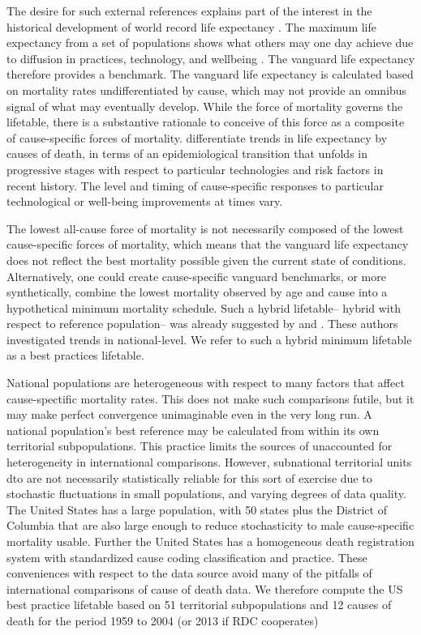 \documentclass[11pt,oneside,a4paper]{article} %
\begin{document}
The desire for such external references explains part of the interest in the
historical development of world record life expectancy \citep{oeppen2002broken}.
The maximum life expectancy from a set of populations shows what others may one
day achieve due to diffusion in practices, technology, and wellbeing
\citep{vallin2010esperance}.
The vanguard life expectancy therefore provides a benchmark. The vanguard life expectancy is calculated based on mortality rates undifferentiated
by cause, which may not provide an omnibus signal of what may eventually develop. While the force of mortality governs the lifetable, there is a substantive rationale to conceive of this force as a composite of cause-specific forces of mortality. \citet{vallin2008minimum} differentiate trends in life expectancy by causes of death, in terms of an epidemiological transition that unfolds in progressive stages with respect to particular technologies and risk factors in recent history. The level and timing of cause-specific responses to particular technological or well-being improvements at times vary.

The lowest all-cause force of mortality is not necessarily composed of the
lowest cause-specific forces of mortality, which means that the vanguard life
expectancy does not reflect the best mortality possible given the current state
of conditions. Alternatively, one could create cause-specific vanguard
benchmarks, or more synthetically, combine the lowest mortality observed by age
and cause into a hypothetical minimum mortality schedule. Such a hybrid
lifetable-- hybrid with respect to reference population-- was already suggested
by \citet{wunsch1975minimum} and \citet{vallin2008minimum}. These authors
investigated trends in national-level. We refer to such a hybrid minimum
lifetable as a best practices lifetable. 

National populations are heterogeneous with respect to many factors that affect cause-spectific mortality rates. This does not make such comparisons futile, but it may make perfect convergence unimaginable even in the very long run. A national population's best reference may be calculated from within its own territorial subpopulations. This practice limits the sources of unaccounted for heterogeneity in international comparisons. However, subnational territorial units dto are not necessarily statistically reliable for this sort of exercise due to stochastic fluctuations in small populations, and varying degrees of data quality. The United States has a large population, with 50 states plus the District of Columbia that are also large enough to reduce stochasticity to male cause-specific mortality usable. Further the United States has a homogeneous death registration system with  standardized cause coding classification and practice. These conveniences with respect to the data source avoid many of the pitfalls of international comparisons of cause of death data. We therefore compute the US best practice lifetable based on 51 territorial subpopulations and 12 causes of death for the period 1959 to 2004 (or 2013 if RDC cooperates) 
\end{document}
